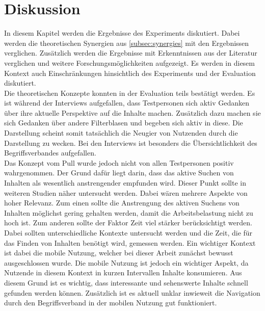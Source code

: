 \section{Diskussion}\label{sec:discussion}
In diesem Kapitel werden die Ergebnisse des Experiments diskutiert.
Dabei werden die theoretischen Synergien aus \autoref{subsec:synergies} mit den Ergebnissen verglichen.
Zusätzlich werden die Ergebnisse mit Erkenntnissen aus der Literatur verglichen und weitere Forschungsmöglichkeiten aufgezeigt.
Es werden in diesem Kontext auch Einschränkungen hinsichtlich des Experiments und der Evaluation diskutiert.\\

Die theoretischen Konzepte konnten in der Evaluation teils bestätigt werden.
Es ist während der Interviews aufgefallen, dass Testpersonen sich aktiv Gedanken über ihre aktuelle Perspektive auf die Inhalte machen.
Zusätzlich dazu machen sie sich Gedanken über andere Filterblasen und begeben sich aktiv in diese.
Die Darstellung scheint somit tatsächlich die Neugier von Nutzenden durch die Darstellung zu wecken.
Bei den Interviews ist besonders die Übersichtlichkeit des Begriffsverbandes aufgefallen. \\

Das Konzept vom Pull wurde jedoch nicht von allen Testpersonen positiv wahrgenommen.
Der Grund dafür liegt darin, dass das aktive Suchen von Inhalten als wesentlich anstrengender empfunden wird.
Dieser Punkt sollte in weiteren Studien näher untersucht werden.
Dabei wären mehrere Aspekte von hoher Relevanz.
Zum einen sollte die Anstrengung des aktiven Suchens von Inhalten möglichst gering gehalten werden, damit die Arbeitsbelastung nicht zu hoch ist.
Zum anderen sollte der Faktor Zeit viel stärker berücksichtigt werden.
Dabei sollten unterschiedliche Kontexte untersucht werden und die Zeit, die für das Finden von Inhalten benötigt wird, gemessen werden.
Ein wichtiger Kontext ist dabei die mobile Nutzung, welcher bei dieser Arbeit zunächst bewusst ausgeschlossen wurde.
Die mobile Nutzung ist jedoch ein wichtiger Aspekt, da Nutzende in diesem Kontext in kurzen Intervallen Inhalte konsumieren.
Aus diesem Grund ist es wichtig, dass interessante und sehenswerte Inhalte schnell gefunden werden können.
Zusätzlich ist es aktuell unklar inwieweit die Navigation durch den Begriffsverband in der mobilen Nutzung gut funktioniert.\\

